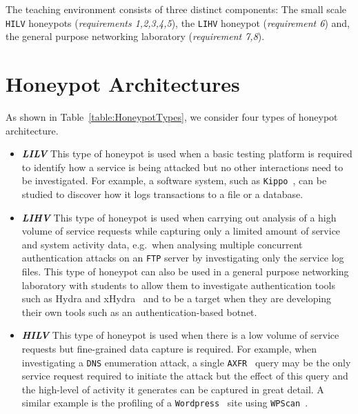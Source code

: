 \documentclass[10pt,journal]{IEEEtran}
\begin{document}
The teaching environment consists of three distinct components: The small scale \texttt{HILV} honeypots
(\textit{requirements 1,2,3,4,5}), the \texttt{LIHV} honeypot
(\textit{requirement 6}) and, the general purpose networking laboratory (\textit{requirement 7,8}).

\section{Honeypot Architectures}\label{sec:HoneyArch}

As shown in Table~\ref{table:HoneypotTypes}, we consider four types 
of honeypot architecture.

\begin{itemize}

  \item \noindent \emph{\textbf{LILV}} This type of honeypot is used when a
    basic testing platform is required to identify how a service is being
    attacked but no other interactions need to be investigated. For example, a
    software system, such as \texttt{Kippo}~\cite{SH:15}, can be studied to
    discover how it logs transactions to a file or a database. 

  \item \noindent \emph{\textbf{LIHV}} This type of honeypot is used when
    carrying out analysis of a high volume of service requests while capturing
    only a limited amount of service and system activity data, e.g.\ when
    analysing multiple concurrent authentication attacks on an
    \texttt{FTP} server by investigating only the service log files. This type of
    honeypot can also be used in a general purpose networking laboratory with
    students to allow them to investigate authentication tools such as Hydra
    and xHydra~\cite{RS:15} and to be a target when they are developing their
    own tools such as an authentication-based botnet.

  \item \noindent \emph{\textbf{HILV}} This type of honeypot is used when there
    is a low volume of service requests but fine-grained data capture is
    required. For example, when investigating a \texttt{DNS} enumeration
    attack, a single \texttt{AXFR}~\cite{EL:10} query may be the only service
    request required to initiate the attack but the effect of this query and
    the high-level of activity it generates can be captured in great detail.  A
    similar example is the profiling of a \texttt{Wordpress}~\cite{WP:17} site
    using \texttt{WPScan}~\cite{WT:17}.


\end{itemize}
\end{document}
